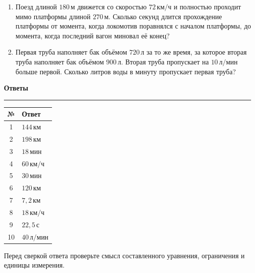 \documentclass[a4paper,12pt]{article}
\newcommand{\sect}[1]{%
    \vspace{0.35em}%
    {\Large\bfseries\color{darkaccent}#1}\par
    \vspace{0.22em}%
    \color{linegray}\hrule
    \color{textgray}%
    \vspace{0.55em}%
}
\newcommand{\unit}[1]{\,\text{#1}}
\begin{document}
\begin{enumerate}
\item
Поезд длиной $180\unit{м}$ движется со скоростью $72\unit{км/ч}$
и полностью проходит мимо платформы длиной $270\unit{м}$.
Сколько секунд длится прохождение платформы
от момента, когда локомотив поравнялся с началом платформы,
до момента, когда последний вагон миновал её конец?

\item
Первая труба наполняет бак объёмом $720\unit{л}$ за то же время,
за которое вторая труба наполняет бак объёмом $900\unit{л}$.
Вторая труба пропускает на $10\unit{л/мин}$ больше первой.
Сколько литров воды в минуту пропускает первая труба?

\end{enumerate}


\clearpage

\sect{Ответы}

\begin{table}[h!]
\centering
\begin{tabularx}{0.9\linewidth}{@{}cX@{}}
\toprule
\textbf{№} & \textbf{Ответ} \\
\midrule
1 & $144\unit{км}$ \\
2 & $198\unit{км}$ \\
3 & $18\unit{мин}$ \\
4 & $60\unit{км/ч}$ \\
5 & $30\unit{мин}$ \\
6 & $120\unit{км}$ \\
7 & $7{,}2\unit{км}$ \\
8 & $18\unit{км/ч}$ \\
9 & $22{,}5\unit{с}$ \\
10 & $40\unit{л/мин}$ \\
\bottomrule
\end{tabularx}
\end{table}

\vfill

\begin{center}
\small\color{softgray}
Перед сверкой ответа проверьте смысл составленного уравнения,
ограничения и единицы измерения.
\end{center}
\end{document}
